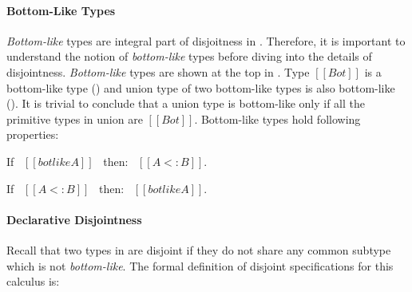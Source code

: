 \paragraph{Bottom-Like Types}
\emph{Bottom-like} types are integral part of disjoitness in \cal. Therefore,
it is important to understand the notion of \emph{bottom-like} types before diving into the details 
of disjointness. \emph{Bottom-like} types are shown at the top in . Type
$[[Bot]]$ is a bottom-like type () and union type of two bottom-like types is also bottom-like 
(). It is trivial to conclude that a union type is bottom-like only if all 
the primitive types in union are $[[Bot]]$. Bottom-like types hold following properties:

\begin{lemma}
  If \ $[[botlike A]]$ \ then: \ $[[A <: B]]$.
\label{lemma:union:bl-soundness}
\end{lemma}

\begin{comment}
\begin{proof}
  By induction on bottom-like relation.
  \begin{itemize}
    \item All cases are trivial to prove.
  \end{itemize}
\end{proof}
\end{comment}

\begin{lemma}
  If \ $[[A <: B]]$ \ then: \ $[[botlike A]]$.
\label{lemma:union:bl-completeness}
\end{lemma}

\begin{comment}
\begin{proof}
  By induction on type $[[A]]$.
  \begin{itemize}
    \item Cases $[[Top]]$, $[[Bot]]$, $[[Int]]$ and $[[A -> B]]$ are trivial to prove.
    \item Case $[[A \/ B]]$ requires \Cref{lemma:union:sub-or}.
  \end{itemize}
\end{proof}
\end{comment}

\paragraph{Declarative Disjointness}
Recall that two types in \cal are disjoint if they do not share any common subtype which is not 
\emph{bottom-like}. The formal definition of disjoint specifications for this calculus is:

